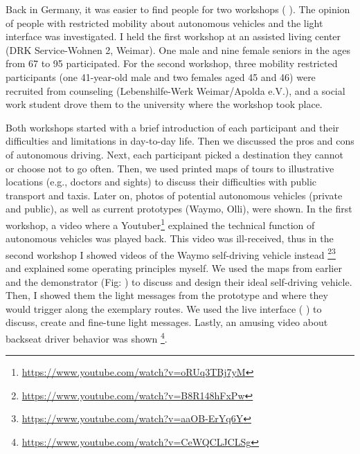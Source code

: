 Back in Germany, it was easier to find people for two workshops ( \emph{}). The opinion of people with restricted mobility about autonomous vehicles and the light interface was investigated. I held the first workshop at an assisted living center (DRK Service-Wohnen 2, Weimar). One male and nine female seniors in the ages from 67 to 95 participated. For the second workshop, three mobility restricted participants (one 41-year-old male and two females aged 45 and 46) were recruited from counseling (Lebenshilfe-Werk Weimar/Apolda e.V.), and a social work student drove them to the university where the workshop took place. 

Both workshops started with a brief introduction of each participant and their difficulties and limitations in day-to-day life. Then we discussed the pros and cons of autonomous driving. Next, each participant picked a destination they cannot or choose not to go often. Then, we used printed maps of tours to illustrative locations (e.g., doctors and sights) to discuss their difficulties with public transport and taxis. Later on, photos of potential autonomous vehicles (private and public), as well as current prototypes (Waymo, Olli), were shown. In the first workshop, a video where a Youtuber\footnote{\url{https://www.youtube.com/watch?v=oRUq3TBj7yM}} explained the technical function of autonomous vehicles was played back. This video was ill-received, thus in the second workshop I showed videos of the Waymo self-driving vehicle instead \footnote{\url{https://www.youtube.com/watch?v=B8R148hFxPw}}\fnsep\footnote{\url{https://www.youtube.com/watch?v=aaOB-ErYq6Y}}  and explained some operating principles myself. We used the maps from earlier and the demonstrator (Fig: \emph{}) to discuss and design their ideal self-driving vehicle. Then, I showed them the light messages from the prototype and where they would trigger along the exemplary routes. We used the live interface ( \emph{}) to discuss, create and fine-tune light messages. Lastly, an amusing video about backseat driver behavior was shown \footnote{\url{https://www.youtube.com/watch?v=CeWQCLJCLSg}}. 

